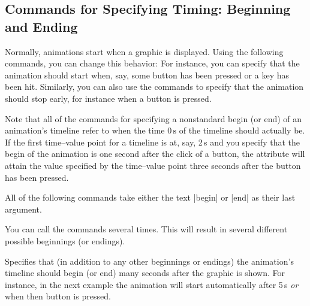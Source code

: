 \subsection{Commands for Specifying Timing: Beginning and Ending}

Normally, animations start when a graphic is displayed. Using the following
commands, you can change this behavior: For instance, you can specify that the
animation should start when, say, some button has been pressed or a key has
been hit. Similarly, you can also use the commands to specify that the
animation should stop early, for instance when a button is pressed.

Note that all of the commands for specifying a nonstandard begin (or end) of an
animation's timeline refer to when the time $0\,\mathrm s$ of the timeline
should actually be. If the first time--value point for a timeline is at, say,
2\,s and you specify that the begin of the animation is one second after the
click of a button, the attribute will attain the value specified by the
time--value point three seconds after the button has been pressed.

All of the following commands take either the text |begin| or |end| as their
last argument.

You can call the commands several times. This will result in several different
possible beginnings (or endings).

\begin{command}{\pgfsysanimkeyoffset{}}
\end{command}
\begin{command}{\pgfsys@animation@offset{}}
    Specifies that (in addition to any other beginnings or endings) the
    animation's timeline should begin (or end)  many seconds
    after the graphic is shown. For instance, in the next example the animation
    will start automatically after 5\,s \emph{or} when then button is pressed.
\begin{codeexample}[imagesource={standalone/pgfmanual-en-pgfsys-animations-animation-29.svg}]
\end{codeexample}
\end{command}

